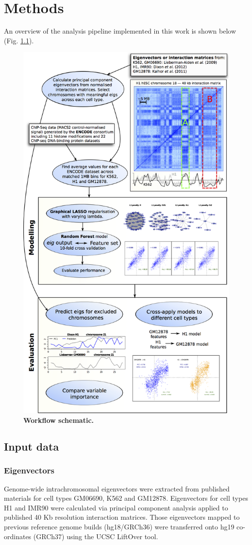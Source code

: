 \documentclass[a4paper]{report}
\begin{document}
\chapter{Methods}
\vspace{-24pt}
An overview of the analysis pipeline implemented in this work
is shown below (Fig. \ref{fig:schema}). \\
\vspace{12pt}
\begin{figure}[H]
\vspace{-24pt}
\begin{center}
\includegraphics[width=.68\textwidth]{figs/pipe.png}
\captionsetup{width=\textwidth}
\caption{ {\bf Workflow schematic.}
} \label{fig:schema}
\end{center} 
\vspace{-24pt}
\end{figure} 

\section{Input data}
\subsection{Eigenvectors}\label{meth:eigs}
Genome-wide intrachromosomal eigenvectors were extracted from
published materials for cell types GM06690,\cite{Lieberman2011}
K562\cite{Lieberman2011} and GM12878\cite{Kalhor2012}. Eigenvectors
for cell types H1 and IMR90 were calculated via principal component
analysis applied to published 40 Kb resolution interaction
matrices.\cite{Dixon2012} Those eigenvectors mapped to previous reference
genome builds (hg18/GRCh36) were transferred onto hg19 co-ordinates
(GRCh37) using the UCSC LiftOver tool.\cite{Hinrichs2006}\\
\end{document}
